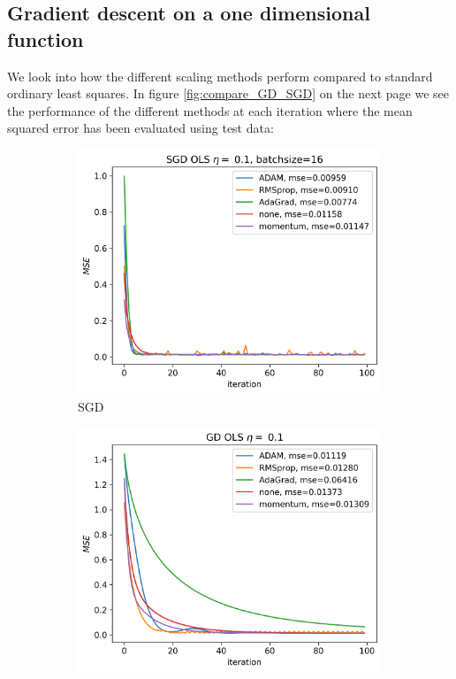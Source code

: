 \documentclass[11pt]{article}
\begin{document}
\subsection{Gradient descent on a one dimensional function}
We look into how the different scaling methods perform compared to standard ordinary least squares. In figure \ref{fig:compare_GD_SGD} on the next page we see the performance of the different methods at each iteration where the mean squared error has been evaluated using test data:
\begin{figure}[H]
    \begin{subfigure}{.5\textwidth}
        \centering
        \includegraphics[width=\textwidth]{../figures/SGD_methods_OLS_eta_0.1.png}
        \caption{SGD}
        \label{fig:}
    \end{subfigure}
    \begin{subfigure}{.5\textwidth}
        \centering
        \includegraphics[width=\textwidth]{../figures/GD_methods_OLS_eta_0.1.png}

\end{subfigure}
\end{figure}
\end{document}
